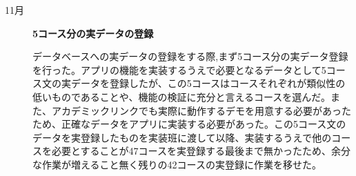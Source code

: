 ﻿\begin{description}
 \item[11月] \textbf{5コース分の実データの登録}\par
データベースへの実データの登録をする際,まず5コース分の実データ登録を行った。アプリの機能を実装するうえで必要となるデータとして5コース文の実データを登録したが、この5コースはコースそれぞれが類似性の低いものであることや、機能の検証に充分と言えるコースを選んだ。また、アカデミックリンクでも実際に動作するデモを用意する必要があったため、正確なデータをアプリに実装する必要があった。この5コース文のデータを実登録したものを実装班に渡して以降、実装するうえで他のコースを必要とすることが47コースを実登録する最後まで無かったため、余分な作業が増えること無く残りの42コースの実登録に作業を移せた。
 \par

\end{description}
